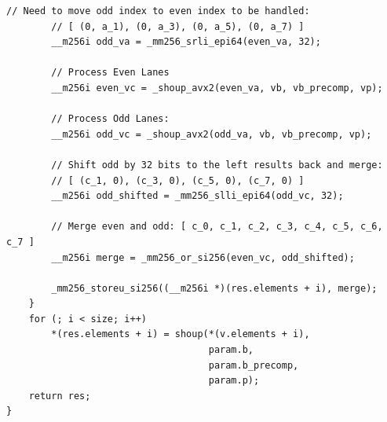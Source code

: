 \documentclass{article}
\begin{document}
\begin{lstlisting}[caption = Auxiliary function of Shoup's modular reduction]
        // Need to move odd index to even index to be handled:
        // [ (0, a_1), (0, a_3), (0, a_5), (0, a_7) ]
        __m256i odd_va = _mm256_srli_epi64(even_va, 32);

        // Process Even Lanes
        __m256i even_vc = _shoup_avx2(even_va, vb, vb_precomp, vp);

        // Process Odd Lanes:
        __m256i odd_vc = _shoup_avx2(odd_va, vb, vb_precomp, vp);

        // Shift odd by 32 bits to the left results back and merge:
        // [ (c_1, 0), (c_3, 0), (c_5, 0), (c_7, 0) ]
        __m256i odd_shifted = _mm256_slli_epi64(odd_vc, 32);

        // Merge even and odd: [ c_0, c_1, c_2, c_3, c_4, c_5, c_6, c_7 ]
        __m256i merge = _mm256_or_si256(even_vc, odd_shifted);

        _mm256_storeu_si256((__m256i *)(res.elements + i), merge);
    }
    for (; i < size; i++)
        *(res.elements + i) = shoup(*(v.elements + i),
                                    param.b,
                                    param.b_precomp,
                                    param.p);
    return res;
}
\end{lstlisting}
\end{document}
